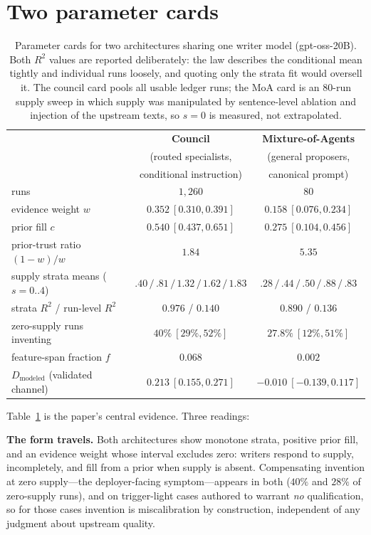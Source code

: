 \documentclass[11pt]{article}
\newcommand{\ww}{\ensuremath{w}}
\newcommand{\cc}{\ensuremath{c}}
\begin{document}
\section{Two parameter cards}
\label{sec:cards}

\begin{table}[t]
\centering
\small
\begin{tabular}{lcc}
\toprule
 & \textbf{Council} & \textbf{Mixture-of-Agents} \\
 & (routed specialists, & (general proposers, \\
 & conditional instruction) & canonical prompt) \\
\midrule
runs & $1{,}260$ & $80$ \\
evidence weight \ww & $0.352\ [0.310, 0.391]$ & $0.158\ [0.076, 0.234]$ \\
prior fill \cc & $0.540\ [0.437, 0.651]$ & $0.275\ [0.104, 0.456]$ \\
prior-trust ratio $(1{-}\ww)/\ww$ & $1.84$ & $5.35$ \\
supply strata means ($s{=}0..4$) & $.40\,/\,.81\,/\,1.32\,/\,1.62\,/\,1.83$
 & $.28\,/\,.44\,/\,.50\,/\,.88\,/\,.83$ \\
strata $R^2$ / run-level $R^2$ & $0.976$ / $0.140$ & $0.890$ / $0.136$ \\
zero-supply runs inventing & $40\%\ [29\%, 52\%]$ & $27.8\%\ [12\%, 51\%]$ \\
feature-span fraction $f$ & $0.068$ & $0.002$ \\
$D_{\text{modeled}}$ (validated channel) & $0.213\ [0.155, 0.271]$
 & $-0.010\ [-0.139, 0.117]$ \\
\bottomrule
\end{tabular}
\caption{Parameter cards for two architectures sharing one writer model
(gpt-oss-20B). Both $R^2$ values are reported deliberately: the law
describes the conditional mean tightly and individual runs loosely, and
quoting only the strata fit would oversell it. The council card pools all
usable ledger runs; the MoA card is an $80$-run supply sweep in which supply
was manipulated by sentence-level ablation and injection of the upstream
texts, so $s{=}0$ is measured, not extrapolated.}
\label{tab:cards}
\end{table}

Table~\ref{tab:cards} is the paper's central evidence. Three readings:

\textbf{The form travels.} Both architectures show monotone strata, positive
prior fill, and an evidence weight whose interval excludes zero: writers
respond to supply, incompletely, and fill from a prior when supply is
absent. Compensating invention at zero supply---the deployer-facing
symptom---appears in both ($40\%$ and $28\%$ of zero-supply runs), and on
trigger-light cases authored to warrant \emph{no} qualification, so for
those cases invention is miscalibration by construction, independent of any
judgment about upstream quality.
\end{document}
